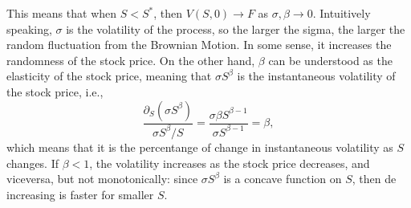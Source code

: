 This means that when $S < S^*$, then $V(S,0) \to F$ as $\sigma, \beta\to0$. Intuitively speaking, $\sigma$ is the volatility of the process, so the larger the sigma, the larger the random fluctuation from the Brownian Motion. In some sense, it increases the randomness of the stock price. On the other hand, $\beta$ can be understood as the elasticity of the stock price, meaning that $\sigma S^\beta$ is the instantaneous volatility of the stock price, i.e., 
\begin{equation}
	\frac{\partial_S \left(\sigma S^\beta\right)}{\sigma S^{\beta}/S} =\frac{\sigma \beta S^{\beta-1}}{\sigma S^{\beta-1}} = \beta,
\end{equation}
which means that it is the percentange of change in instantaneous volatility as $S$ changes. If $\beta < 1$, the volatility increases as the stock price decreases, and viceversa, but not monotonically: since $\sigma S^{\beta}$ is a concave function on $S$, then de increasing is faster for smaller $S$.


